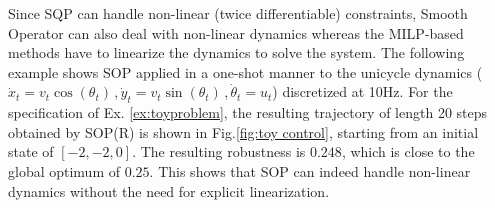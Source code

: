 \begin{exmp}
	\label{ex:nl_unicycle}
Since SQP can handle non-linear (twice differentiable) constraints, Smooth Operator can also deal with non-linear dynamics whereas the MILP-based methods have to linearize the dynamics to solve the system. 
The following example shows SOP applied in a one-shot manner to the unicycle dynamics ($\dot{x}_t=v_t \cos (\theta_t)\, ,\dot{y}_t=v_t \sin (\theta_t)\, ,\dot{\theta}_t= u_t$) discretized at 10Hz.
For the specification of Ex. \ref{ex:toyproblem}, the resulting trajectory of length 20 steps obtained by SOP(R) is shown in Fig.\ref{fig:toy control}, starting from an initial state of $[-2,-2,0]$. The resulting robustness is $0.248$, which is close to the global optimum of $0.25$. This shows that SOP can indeed handle non-linear dynamics without the need for explicit linearization.
\end{exmp}